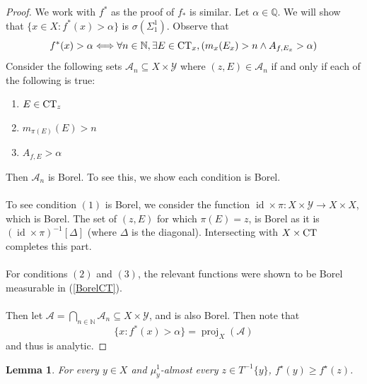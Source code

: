 \documentclass{article}
\newcommand{\N}{\mathbb{N}}
\DeclareMathOperator{\id}{id}
\DeclareMathOperator{\proj}{proj}
\newcommand{\CT}{\textmd{CT}}
\let\oldref\ref
\renewcommand{\ref}[1]{(\oldref{#1})}
\newtheorem{lemma}[theorem]{Lemma}
\theoremstyle{definition}
\begin{document}
\begin{proof}
    We work with $ f^* $ as the proof of $ f_* $ is similar. Let $ \alpha\in \mathbb{Q} $. We will show that $ \{x\in X:f^*(x)>\alpha\} $ is $ \sigma(\Sigma^1_1) $. Observe that
    \[
    f^*(x)>\alpha \Longleftrightarrow \forall n\in \mathbb{N},\exists E\in \CT_x,(m_x(E_x)>n\wedge A_{f,E_x}>\alpha) 
    \]
    Consider the following sets $ \mathcal{A}_n\subseteq X\times \mathcal{Y} $ where $ (z,E)\in \mathcal{A}_n $ if and only if each of the following is true:
    \begin{enumerate}
        \item $ E\in \CT_z $
        \item $ m_{\pi(E)}(E) > n $
        \item $ A_{f,E} > \alpha $
    \end{enumerate}
    Then $ \mathcal{A}_n $ is Borel. To see this, we show each condition is Borel.\\\\
    To see condition $ (1) $ is Borel, we consider the function $ \id\times \pi:X\times \mathcal{Y}\rightarrow X\times X $, which is Borel. The set of $ (z,E) $ for which $ \pi(E) = z $, is Borel as it is $ (\id\times \pi)^{-1} [\Delta] $ (where $ \Delta $ is the diagonal). Intersecting with $ X\times \CT $ completes this part.\\\\
    For conditions $ (2) $ and $ (3) $, the relevant functions were shown to be Borel measurable in \ref{BorelCT}.\\\\
    Then let $ \mathcal{A} = \bigcap_{n\in \N} \mathcal{A}_n \subseteq X\times \mathcal{Y} $, and is also Borel. Then note that
    \[
    \{x:f^*(x)>\alpha\} = \proj_X(\mathcal{A})
    \]
    and thus is analytic.
\end{proof}
\begin{lemma}\label{importantforinvariance}
    For every $ y\in X $ and $ \mu^1_y $-almost every $ z\in T^{-1}\{y\} $, $ f^\star(y) \geq f^\star (z) $.
\end{lemma} 
\end{document}
